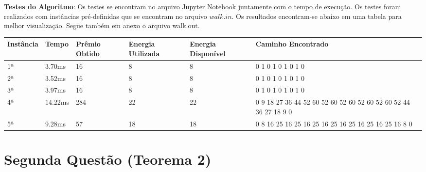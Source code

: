 \documentclass{article}
\begin{document}
\textbf{Testes do Algoritmo}: Os testes se encontram no arquivo Jupyter Notebook juntamente com o tempo de execução. Os testes foram realizados com instâncias pré-definidas que se encontram no arquivo $walk.in$. Os resultados encontram-se abaixo em uma tabela para melhor visualização. Segue também em anexo o arquivo walk.out.

\begin{table}[H]
\centering
\begin{tabular}{l|l|l|l|l|p{4cm}}
Instância & Tempo & Prêmio Obtido & Energia Utilizada & Energia Disponível & Caminho Encontrado\\\hline
1ª & 3.70ms & 16 & 8 & 8 & 0 1 0 1 0 1 0 1 0\\
2ª & 3.52ms & 16 & 8 & 8 & 0 1 0 1 0 1 0 1 0\\
3ª & 3.97ms & 16 & 8 & 8 & 0 1 0 1 0 1 0 1 0\\
4ª & 14.22ms & 284 & 22 & 22 & 0 9 18 27 36 44 52 60 52 60 52 60 52 60 52 60 52 44 36 27 18 9 0\\
5ª & 9.28ms & 57 & 18 & 18 & 0 8 16 25 16 25 16 25 16 25 16 25 16 25 16 25 16 8 0
\end{tabular}
\end{table}

\pagebreak

\section{Segunda Questão (Teorema 2)}
\end{document}
